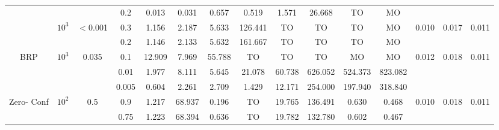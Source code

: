 \begin{sidewaystable}
\begin{lrbox}{\lstbox}
\begin{minipage}{\textheight}
\begin{tabular}{ccccccccccccccc}
				                                               &                            &                           & 0.2                      & 0.013       & 0.031        & 0.657       & 0.519    & 1.571   & 26.668  & TO      & MO                                                                                               \\
				\cmidrule[0.5pt](r){2-15}
				                                               & \multirow{2}{*}{$10^3$}    & \multirow{2}{*}{$<$0.001} & 0.3                      & 1.156       & 2.187        & 5.633       & 126.441  & TO      & TO      & TO      & MO      & \multirow{2}{*}{0.010}             & \multirow{2}{*}{0.017}   & \multirow{2}{*}{0.011} \\
				                                               &                            &                           & 0.2                      & 1.146       & 2.133        & 5.632       & 161.667  & TO      & TO      & TO      & MO                                                                                               \\
				\midrule
				\multirow{3}{*}{BRP}                           & \multirow{3}{*}{$10^3$}    & \multirow{3}{*}{0.035}    & 0.1                      & 12.909      & 7.969        & 55.788      & TO       & TO      & TO      & MO      & MO      & \multirow{3}{*}{0.012}             & \multirow{3}{*}{0.018}   & \multirow{3}{*}{0.011} \\
				                                               &                            &                           & \cellcolor{gray!25}0.01  & 1.977       & 8.111        & 5.645       & 21.078   & 60.738  & 626.052 & 524.373 & 823.082                                                                                          \\
				                                               &                            &                           & \cellcolor{gray!25}0.005 & 0.604       & 2.261        & 2.709       & 1.429    & 12.171  & 254.000 & 197.940 & 318.840                                                                                          \\
				\midrule
				\multirow{8}{*}{\parbox{4em}{Zero- Conf}}      & \multirow{4}{*}{$10^2$}    & \multirow{4}{*}{0.5}      & 0.9                      & 1.217       & 68.937       & 0.196       & TO       & 19.765  & 136.491 & 0.630   & 0.468   & \multirow{4}{*}{0.010}             & \multirow{4}{*}{0.018}   & \multirow{4}{*}{0.011} \\
				                                               &                            &                           & 0.75                     & 1.223       & 68.394       & 0.636       & TO       & 19.782  & 132.780 & 0.602   & 0.467                                                                                            \\

\end{tabular}
\end{minipage}
\end{lrbox}
\end{sidewaystable}
